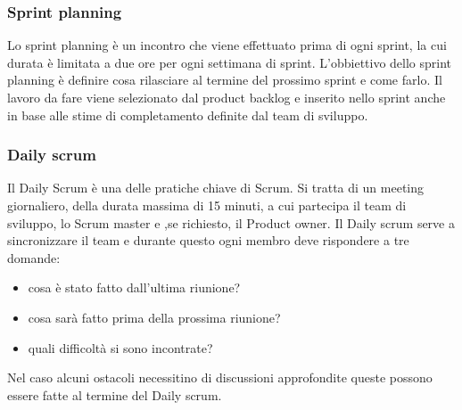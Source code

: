 \subsubsection{Sprint planning}
Lo sprint planning è un incontro che viene effettuato prima di ogni sprint, la cui durata è limitata a due ore per ogni settimana di sprint. L'obbiettivo dello sprint planning è definire cosa rilasciare al termine del prossimo sprint e come farlo.
Il lavoro da fare viene selezionato dal product backlog e inserito nello sprint anche in base alle stime di completamento definite dal team di sviluppo.

\subsubsection{Daily scrum}
Il Daily Scrum è una delle pratiche chiave di Scrum. Si tratta di un meeting giornaliero, della durata massima di 15 minuti, a cui partecipa il team di sviluppo, lo Scrum master e ,se richiesto, il Product owner. Il Daily scrum serve a sincronizzare il team e durante questo ogni membro deve rispondere a tre domande:
\begin{itemize}
    \item cosa è stato fatto dall'ultima riunione?
    \item cosa sarà fatto prima della prossima riunione?
    \item quali difficoltà si sono incontrate?
\end{itemize}
Nel caso alcuni ostacoli necessitino di discussioni approfondite queste possono essere fatte al termine del Daily scrum.

